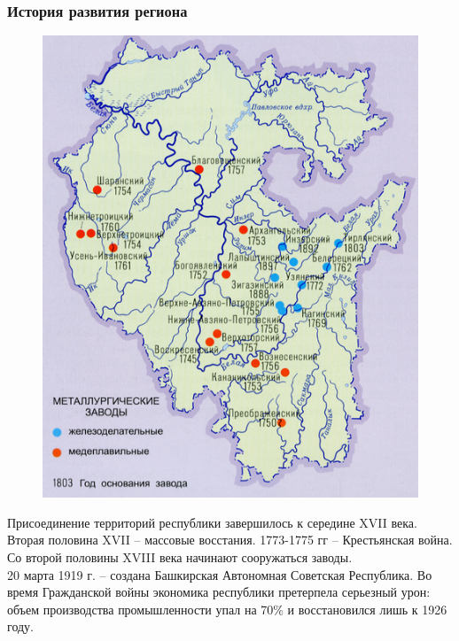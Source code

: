 \begin{frame} 
\frametitle{История развития региона}
\begin{figure}
\includegraphics[width=1\linewidth]{pics/sasha/factories_18-19} 
\end{figure}
Присоединение территорий республики завершилось к середине XVII века. \\[10pt]

Вторая половина XVII -- массовые восстания. 1773-1775 гг -- Крестьянская война. \\[10pt]

Со второй половины XVIII века начинают сооружаться заводы. \\[10pt]

20 марта 1919 г. -- создана Башкирская Автономная Советская Республика. Во время Гражданской войны экономика республики претерпела серьезный урон: объем производства промышленности упал на 70\% и восстановился лишь к 1926 году.

\end{frame}

